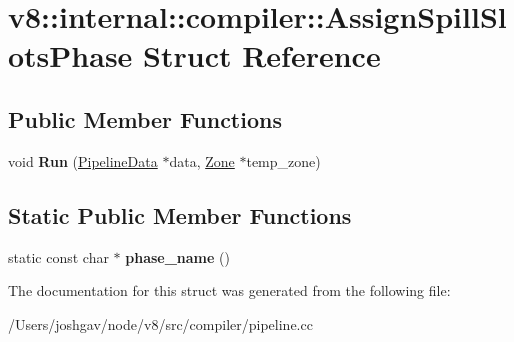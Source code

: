 \hypertarget{structv8_1_1internal_1_1compiler_1_1_assign_spill_slots_phase}{}\section{v8\+:\+:internal\+:\+:compiler\+:\+:Assign\+Spill\+Slots\+Phase Struct Reference}
\label{structv8_1_1internal_1_1compiler_1_1_assign_spill_slots_phase}
\subsection*{Public Member Functions}
\begin{DoxyCompactItemize}
\item 
void {\bfseries Run} (\hyperlink{classv8_1_1internal_1_1compiler_1_1_pipeline_data}{Pipeline\+Data} $\ast$data, \hyperlink{classv8_1_1internal_1_1_zone}{Zone} $\ast$temp\+\_\+zone)\hypertarget{structv8_1_1internal_1_1compiler_1_1_assign_spill_slots_phase_af07dc8c98c4ddf64f3ca7aa7505ab2ca}{}\label{structv8_1_1internal_1_1compiler_1_1_assign_spill_slots_phase_af07dc8c98c4ddf64f3ca7aa7505ab2ca}

\end{DoxyCompactItemize}
\subsection*{Static Public Member Functions}
\begin{DoxyCompactItemize}
\item 
static const char $\ast$ {\bfseries phase\+\_\+name} ()\hypertarget{structv8_1_1internal_1_1compiler_1_1_assign_spill_slots_phase_ab98ee431175de3794efb9caab8f0ef8d}{}\label{structv8_1_1internal_1_1compiler_1_1_assign_spill_slots_phase_ab98ee431175de3794efb9caab8f0ef8d}

\end{DoxyCompactItemize}


The documentation for this struct was generated from the following file\+:\begin{DoxyCompactItemize}
\item 
/\+Users/joshgav/node/v8/src/compiler/pipeline.\+cc\end{DoxyCompactItemize}
